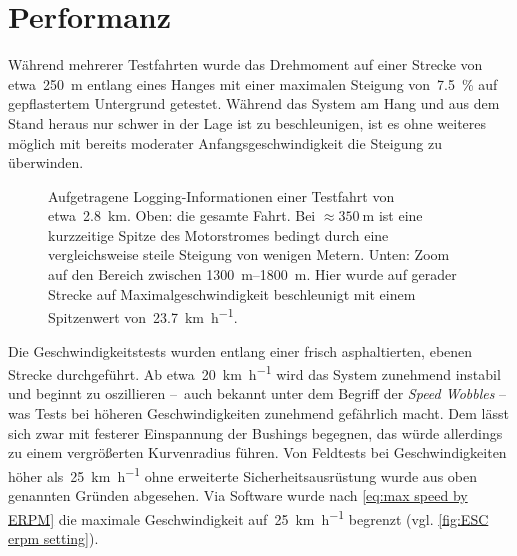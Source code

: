 	\section{Performanz}
		Während mehrerer Testfahrten wurde das Drehmoment auf einer Strecke von etwa~\qty{250}{\metre} entlang eines Hanges mit einer maximalen Steigung von~\qty{7,5}{\percent} auf gepflastertem Untergrund getestet.
		Während das System am Hang und aus dem Stand heraus nur schwer in der Lage ist zu beschleunigen, ist es ohne weiteres möglich mit bereits moderater Anfangsgeschwindigkeit die Steigung zu überwinden.
		\begin{figure}[h]
			\centering
			
			\caption[Aufgetragene Logging-Informationen einer Testfahrt]{Aufgetragene Logging-Informationen einer Testfahrt von etwa~\qty{2,8}{\kilo\metre}. Oben: die gesamte Fahrt. Bei \(\approx \qty{350}{\metre}\) ist eine kurzzeitige Spitze des Motorstromes bedingt durch eine vergleichsweise steile Steigung von wenigen Metern. Unten: Zoom auf den Bereich zwischen \qtyrange{1300}{1800}{\metre}. Hier wurde auf gerader Strecke auf Maximalgeschwindigkeit beschleunigt mit einem Spitzenwert von~\qty{23,7}{\kilo\metre\per\hour}.}%
			\label{fig:esc testdrive plot}
		\end{figure}
		Die Geschwindigkeitstests wurden entlang einer frisch asphaltierten, ebenen Strecke durchgeführt.
		Ab etwa~\qty{20}{\kilo\metre\per\hour} wird das System zunehmend instabil und beginnt zu oszillieren --~auch bekannt unter dem Begriff der \textit{Speed Wobbles} -- was Tests bei höheren Geschwindigkeiten zunehmend gefährlich macht.
		Dem lässt sich zwar mit festerer Einspannung der Bushings begegnen, das würde allerdings zu einem vergrößerten Kurvenradius führen.
		Von Feldtests bei Geschwindigkeiten höher als~\qty{25}{\kilo\metre\per\hour} ohne erweiterte Sicherheitsausrüstung wurde aus oben genannten Gründen abgesehen.
		Via Software wurde nach \cref{eq:max speed by ERPM} die maximale Geschwindigkeit auf~\qty{25}{\kilo\metre\per\hour} begrenzt (vgl. \cref{fig:ESC erpm setting}).
		
